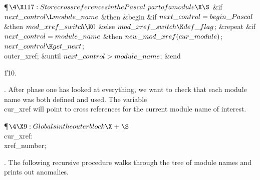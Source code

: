 \Y\P$\4\X117:Store cross references in the \PASCAL\ part of a module\X\S$\6
\&{if} $\\{next\_control}\L\\{module\_name}$ \1\&{then}\6
\&{begin} \&{if} $\\{next\_control}=\\{begin\_Pascal}$ \1\&{then}\5
$\\{mod\_xref\_switch}\K0$\6
\4\&{else} $\\{mod\_xref\_switch}\K\\{def\_flag}$;\2\6
\1\&{repeat} \&{if} $\\{next\_control}=\\{module\_name}$ \1\&{then}\5
$\\{new\_mod\_xref}(\\{cur\_module})$;\2\6
$\\{next\_control}\K\\{get\_next}$;\5
\\{outer\_xref};\6
\4\&{until}\5
$\\{next\_control}>\\{module\_name}$;\2\6
\&{end}\2\par
\U110.\fi

. After phase one has looked at everything, we want to check that each
module name was both defined and used.
The variable \\{cur\_xref} will point to cross references for the
current module name of interest.

\Y\P$\4\X9:Globals in the outer block\X\mathrel{+}\S$\6
\4\\{cur\_xref}: \\{xref\_number};\par
\fi

. The following recursive procedure
walks through the tree of module names and prints out anomalies.


